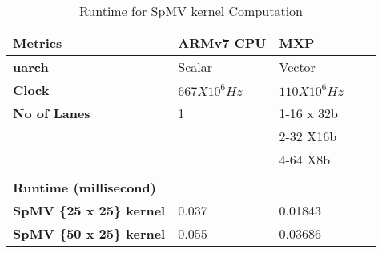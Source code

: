 \begin{table}[htbp]
	\centering
	
	\begin{adjustbox}{width=.7\textwidth}
		\small
		
	\begin{tabular}{lllll}
		\toprule
		\textbf{Metrics} & \textbf{ARMv7 CPU} & \textbf{MXP}  \\
		\midrule
		\textbf{uarch} & Scalar & Vector \\
		\textbf{Clock} & $667 X 10^{6} Hz$ & $110 X 10^{6}Hz$  \\
		\textbf{No of Lanes} & 1 & 1-16 x 32b  \\
		&   & 2-32 X16b  \\
		&   & 4-64 X8b \\
		&   &   \\
		\midrule
		\textbf{Runtime (millisecond)  } &   &   &   &  \\
		\midrule
		\textbf{SpMV \{25 x 25\} kernel} & 0.037 & 0.01843  \\
		\textbf{SpMV \{50 x 25\} kernel} & 0.055 & 0.03686  \\
		\bottomrule
	\end{tabular}%
    \end{adjustbox}%
      \caption{Runtime for SpMV kernel Computation}
	\label{www:1010}%
\end{table}%
    	 